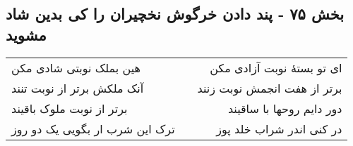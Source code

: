 \begin{center}
\section*{بخش ۷۵ - پند دادن خرگوش نخچیران را کی بدین شاد مشوید}
\label{sec:sh075}
\begin{longtable}{l p{0.5cm} r}
هین بملک نوبتی شادی مکن
&&
ای تو بستهٔ نوبت آزادی مکن
\\
آنک ملکش برتر از نوبت تنند
&&
برتر از هفت انجمش نوبت زنند
\\
برتر از نوبت ملوک باقیند
&&
دور دایم روحها با ساقیند
\\
ترک این شرب ار بگویی یک دو روز
&&
در کنی اندر شراب خلد پوز
\\
\end{longtable}
\end{center}
